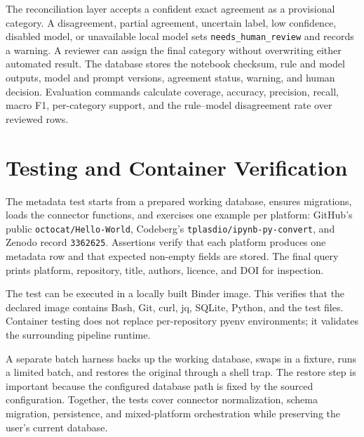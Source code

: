 The reconciliation layer accepts a confident exact agreement as a provisional category. A disagreement, partial agreement, uncertain label, low confidence, disabled model, or unavailable local model sets \texttt{needs\_human\_review} and records a warning. A reviewer can assign the final category without overwriting either automated result. The database stores the notebook checksum, rule and model outputs, model and prompt versions, agreement status, warning, and human decision. Evaluation commands calculate coverage, accuracy, precision, recall, macro F1, per-category support, and the rule--model disagreement rate over reviewed rows.

\section{Testing and Container Verification}

The metadata test starts from a prepared working database, ensures migrations, loads the connector functions, and exercises one example per platform: GitHub's public \texttt{octocat/Hello-World}, Codeberg's \texttt{tplasdio/ipynb-py-convert}, and Zenodo record \texttt{3362625}. Assertions verify that each platform produces one metadata row and that expected non-empty fields are stored. The final query prints platform, repository, title, authors, licence, and DOI for inspection.

The test can be executed in a locally built Binder image. This verifies that the declared image contains Bash, Git, curl, jq, SQLite, Python, and the test files. Container testing does not replace per-repository pyenv environments; it validates the surrounding pipeline runtime.

A separate batch harness backs up the working database, swaps in a fixture, runs a limited batch, and restores the original through a shell trap. The restore step is important because the configured database path is fixed by the sourced configuration. Together, the tests cover connector normalization, schema migration, persistence, and mixed-platform orchestration while preserving the user's current database.
